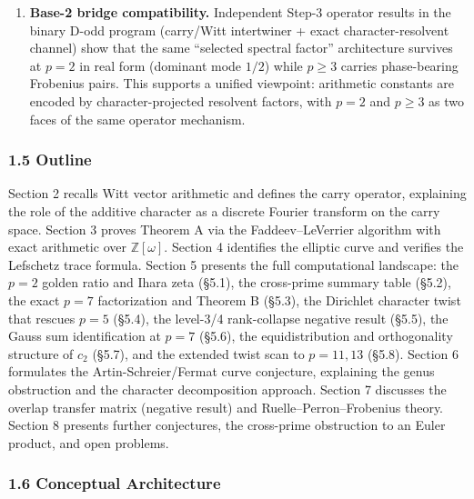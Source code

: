 \documentclass[
  11pt,
]{article}
\begin{document}
\begin{enumerate}
  \(Q_p(x,y) = (x^p y^p - (xy)^p)/p\). The genus \(g = (p-1)(p-2)/2\) of the
  associated Fermat curve determines the degree \(2g\) of the full Frobenius
  polynomial: for \(p = 3\), \(g = 1\) and the factor is quadratic; for
  \(p = 7\), the \(49 \times 49\) matrix captures 6 of the expected \(2g = 30\)
  eigenvalues.
\item
  \textbf{Base-2 bridge compatibility.} Independent Step-3 operator results in
  the binary D-odd program (carry/Witt intertwiner + exact character-resolvent
  channel) show that the same ``selected spectral factor'' architecture survives
  at \(p=2\) in real form (dominant mode \(1/2\)) while \(p \ge 3\) carries
  phase-bearing Frobenius pairs. This supports a unified viewpoint: arithmetic
  constants are encoded by character-projected resolvent factors, with \(p=2\)
  and \(p\ge3\) as two faces of the same operator mechanism.
\end{enumerate}

\subsubsection{1.5 Outline}\label{outline}

Section 2 recalls Witt vector arithmetic and defines the carry operator,
explaining the role of the additive character as a discrete Fourier transform on
the carry space. Section 3 proves Theorem A via the Faddeev--LeVerrier algorithm
with exact arithmetic over \(\mathbb{Z}[\omega]\). Section 4 identifies the
elliptic curve and verifies the Lefschetz trace formula. Section 5 presents the
full computational landscape: the \(p=2\) golden ratio and Ihara zeta (§5.1),
the cross-prime summary table (§5.2), the exact \(p=7\) factorization and
Theorem B (§5.3), the Dirichlet character twist that rescues \(p=5\) (§5.4), the
level-3/4 rank-collapse negative result (§5.5), the Gauss sum identification at
\(p=7\) (§5.6), the equidistribution and orthogonality structure of \(c_2\)
(§5.7), and the extended twist scan to \(p=11, 13\) (§5.8). Section 6 formulates
the Artin-Schreier/Fermat curve conjecture, explaining the genus obstruction and
the character decomposition approach. Section 7 discusses the overlap transfer
matrix (negative result) and Ruelle--Perron--Frobenius theory. Section 8
presents further conjectures, the cross-prime obstruction to an Euler product,
and open problems.

\newpage

\subsubsection{1.6 Conceptual Architecture}\label{conceptual-architecture}
\end{document}

